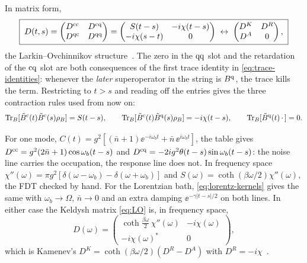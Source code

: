In matrix form,
\begin{equation}
  \boxed{\;
  D(t,s)=\begin{pmatrix} D^{\mathrm{c}\mathrm{c}} & D^{\mathrm{c}\mathrm{q}}\\ D^{\mathrm{q}\mathrm{c}} & D^{\mathrm{q}\mathrm{q}}\end{pmatrix}
   =\begin{pmatrix} S(t-s) & -i\chi(t-s)\\ -i\chi(s-t) & 0\end{pmatrix}
   \;\leftrightarrow\;
   \begin{pmatrix} D^K & D^R\\ D^A & 0\end{pmatrix},\;}
  \label{eq:LO}
\end{equation}
the Larkin--Ovchinnikov structure~\cite{LarkinOvchinnikov1975,RammerSmith1986}. The zero
in the $\mathrm{q}\mathrm{q}$ slot and the retardation of the $\mathrm{c}\mathrm{q}$ slot are both consequences of the
first trace identity in \cref{eq:trace-identities}: whenever the \emph{later} superoperator
in the string is $B^{\mathrm{q}}$, the trace kills the term. Restricting to $t>s$ and reading off the
entries gives the three contraction rules used from now on:
\begin{equation}
  \operatorname{Tr}_B[\tilde B^{\mathrm{c}}(t)\tilde B^{\mathrm{c}}(s)\rho_{B}]=S(t-s),\qquad
  \operatorname{Tr}_B[\tilde B^{\mathrm{c}}(t)\tilde B^{\mathrm{q}}(s)\rho_{B}]=-i\chi(t-s),\qquad
  \operatorname{Tr}_B[\tilde B^{\mathrm{q}}(t)\,\cdot\,]=0 .
  \label{eq:contractions}
\end{equation}

\begin{exbox}
For one mode, $C(t)=g^2[(\bar n+1)\ee^{-i\omega_bt}+\bar n\,\ee^{i\omega_bt}]$, the table gives
$D^{\mathrm{c}\mathrm{c}}=g^2(2\bar n+1)\cos\omega_b(t-s)$ and $D^{\mathrm{c}\mathrm{q}}=-2ig^2\theta(t-s)\sin\omega_b(t-s)$: the noise
line carries the occupation, the response line does not. In frequency space
$\chi''(\omega)=\pi g^2[\delta(\omega-\omega_b)-\delta(\omega+\omega_b)]$ and $S(\omega)=\coth(\beta\omega/2)\chi''(\omega)$, the FDT checked
by hand. For the Lorentzian bath, \cref{eq:lorentz-kernels} gives the same with
$\omega_b\to\Omega$, $\bar n\to0$ and an extra damping $\ee^{-\gamma|t-s|/2}$ on both lines. In
either case the Keldysh matrix \cref{eq:LO} is, in frequency space,
\begin{equation}
  D(\omega)=\begin{pmatrix} \coth\tfrac{\beta\omega}2\,\chi''(\omega) & -i\chi(\omega)\\ -i\chi(\omega)^* & 0\end{pmatrix},
\end{equation}
which is Kamenev's $D^K=\coth(\beta\omega/2)(D^R-D^A)$ with $D^R=-i\chi$~\cite[Sec.~2.6]{Kamenev2011}.
\end{exbox}

